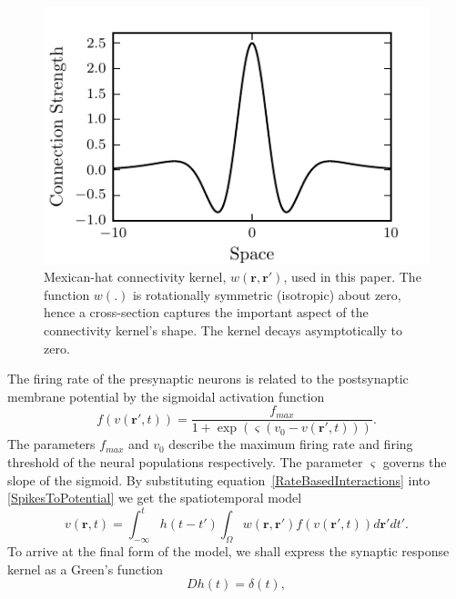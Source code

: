 \documentclass[10pt]{article}
\begin{document}
\begin{figure}
   	\begin{center}
   		\includegraphics{./Graph/Cross_section_kernel.pdf} 
   	\end{center}
   	\caption{Mexican-hat connectivity kernel, $w(\mathbf{r},\mathbf{r'})$, used in this paper. The function $w(.)$ is rotationally symmetric (isotropic) about zero, hence a cross-section captures the important aspect of the connectivity kernel's shape. The kernel decays asymptotically to zero.}
 	\label{fig:2d_kernel}
   \end{figure}
The firing rate of the presynaptic neurons is related to the postsynaptic membrane potential by the sigmoidal activation function 
\begin{equation}
	\label{ActivationFunction} f\left( v\left( \mathbf{r}', t \right) \right) = \frac{f_{max}}{1 + \exp \left( \varsigma \left( v_0 - v\left(\mathbf{r}',t\right) \right) \right)}. 
\end{equation}
The parameters $f_{max}$ and $v_0$ describe the maximum firing rate and firing threshold of the neural populations respectively. The parameter $\varsigma$ governs the slope of the sigmoid. By substituting equation~\ref{RateBasedInteractions} into \ref{SpikesToPotential} we get the spatiotemporal model 
\begin{equation}
	\label{FullDoubleIntModel} v\left(\mathbf{r},t\right) =
	\int_{-\infty}^t 
	h\left(t - t'\right) \int_\Omega
	w\left(\mathbf{r},\mathbf{r}'\right) 
	f\left( v\left( \mathbf{r}',t \right)\right)
	d\mathbf{r}'dt'.
\end{equation}
To arrive at the final form of the model, we shall express the synaptic response kernel as a Green's function 
\begin{equation}
	\label{GreensFuncDef} Dh\left( t \right) = \delta \left( t \right), 
\end{equation}
\end{document}
